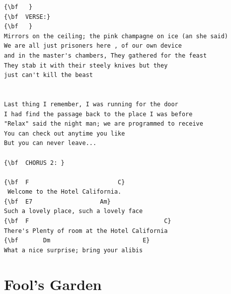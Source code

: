 \documentclass[a4paper]{article}
\begin{document}
\begin{Verbatim}[commandchars=\\\{\}]
{\bf   }
{\bf  VERSE:}
{\bf   }
Mirrors on the ceiling; the pink champagne on ice (an she said)
We are all just prisoners here , of our own device
and in the master's chambers, They gathered for the feast
They stab it with their steely knives but they
just can't kill the beast


Last thing I remember, I was running for the door
I had find the passage back to the place I was before 
"Relax" said the night man; we are programmed to receive
You can check out anytime you like
But you can never leave...  

{\bf  CHORUS 2: }

{\bf  F                         C}
 Welcome to the Hotel California.
{\bf  E7                   Am}
Such a lovely place, such a lovely face
{\bf  F                                      C}
There's Plenty of room at the Hotel California
{\bf       Dm                          E}
What a nice surprise; bring your alibis

\end{Verbatim}
\newpage
\section{Fool's Garden}
\end{document}
